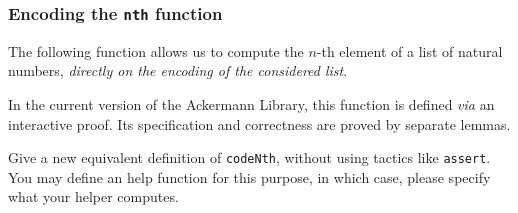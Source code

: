   \subsubsection{Encoding the \texttt{nth} function}

  The following function allows us to compute the $n$-th element of a list of natural numbers, \emph{directly on the encoding of the considered list}.

  In the current version of the Ackermann Library, this function is defined \emph{via} an interactive proof. Its specification and
  correctness are proved by  separate lemmas. 
  


  \begin{exercise}
  Give a new equivalent definition of \texttt{codeNth}, without using tactics like \texttt{assert}.  You may define an help function for this purpose, in which case, please specify what your helper computes.
  \end{exercise}



  

       